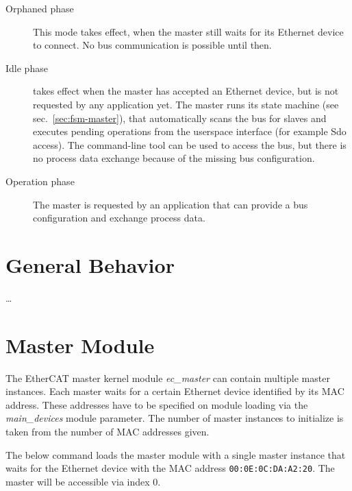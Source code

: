 \documentclass[a4paper,12pt,BCOR6mm,bibtotoc,idxtotoc]{scrbook}
\begin{document}
\begin{description}

\item[Orphaned phase] This mode takes effect, when the
master still waits for its Ethernet device to connect. No bus communication is
possible until then.

\item[Idle phase] takes effect when the master has accepted
an Ethernet device, but is not requested by any application yet. The master
runs its state machine (see sec.~\ref{sec:fsm-master}), that automatically
scans the bus for slaves and executes pending operations from the userspace
interface (for example Sdo access). The command-line tool can be used to
access the bus, but there is no process data exchange because of the missing
bus configuration.

\item[Operation phase] The master is requested by an
application that can provide a bus configuration and exchange process data.

\end{description}


\section{General Behavior}

\ldots



\section{Master Module}
\label{sec:mastermod}

The EtherCAT master kernel module \textit{ec\_master} can contain multiple
master instances. Each master waits for a certain Ethernet device identified
by its MAC address. These addresses have to be specified on
module loading via the \textit{main\_devices} module parameter. The number of
master instances to initialize is taken from the number of MAC addresses
given.

The below command loads the master module with a single master instance that
waits for the Ethernet device with the MAC address
\lstinline+00:0E:0C:DA:A2:20+. The master will be accessible via index $0$.
\end{document}
